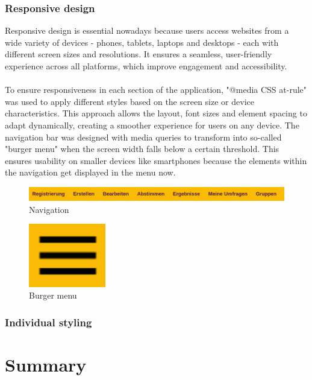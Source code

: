 \documentclass[a4paper,12pt]{report}
\begin{document}
\subsection{Responsive design}
Responsive design is essential nowadays because users access websites from a wide variety of devices - phones, tablets, laptops and desktops - each with different screen sizes and resolutions. It ensures a seamless, user-friendly experience across all platforms, which improve engagement and accessibility.\\ \\
To ensure responsiveness in each section of the application, "@media CSS at-rule" was used to apply different styles based on the screen size or device characteristics. This approach allows the layout, font sizes and element spacing to adapt dynamically, creating a smoother experience for users on any device. The navigation bar was designed with media queries to transform into so-called "burger menu" when the screen width falls below a certain threshold. This ensures usability on smaller devices like smartphones because the elements within the navigation get displayed in the menu now.
\begin{figure}[h!]
	\centering
	\includegraphics[width=1\textwidth]{pics/navigation.png}
	\caption{Navigation}
	\label{fig:navigation}
\end{figure}
\begin{figure}[H]
	\centering
	\includegraphics[width=0.3\textwidth]{pics/burger_menu.png}
	\caption{Burger menu}
	\label{fig:burger_menu}
\end{figure}
\subsection{Individual styling}

\chapter{Summary}

\printbibliography

\listoffigures
\newpage
\end{document}
